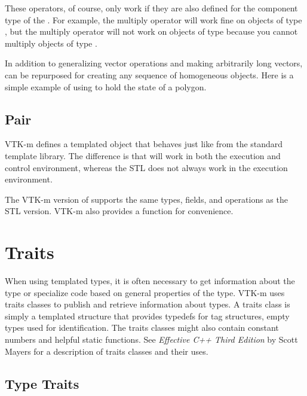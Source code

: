 
These operators, of course, only work if they are also defined for the
component type of the . For example, the multiply operator will
work fine on objects of type , but the multiply
operator will not work on objects of type 
because you cannot multiply objects of type .

In addition to generalizing vector operations and making arbitrarily long
vectors,  can be repurposed for creating any sequence of
homogeneous objects. Here is a simple example of using  to hold
the state of a polygon.



\subsection{Pair}

VTK-m defines a  templated object that
behaves just like  from the standard template
library. The difference is that  will work in both the execution
and control environment, whereas the STL  does not
always work in the execution environment.

The VTK-m version of  supports the same types, fields, and
operations as the STL version. VTK-m also provides a 
function for convenience.

\section{Traits}
\label{sec:Traits}


When using templated types, it is often necessary to get information about
the type or specialize code based on general properties of the type. VTK-m
uses traits classes to publish and retrieve information about types. A
traits class is simply a templated structure that provides typedefs for
tag structures, empty types used for identification. The traits
classes might also contain constant numbers and helpful static
functions. See {\it Effective C++ Third Edition} by Scott Mayers for a
description of traits classes and their uses.

\subsection{Type Traits}

